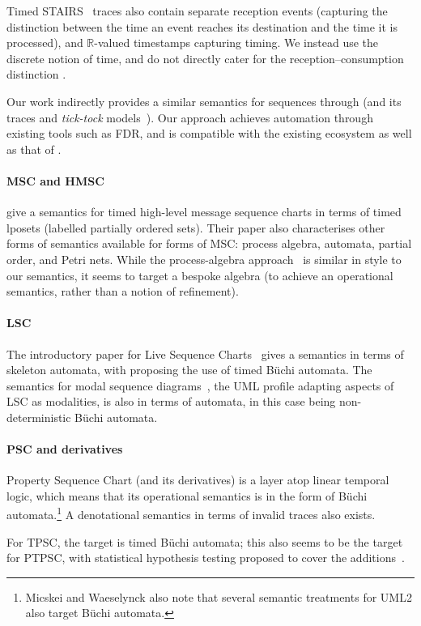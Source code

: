 Timed
STAIRS~\cite{Haugen05-TimedSTAIRS} traces also contain separate reception
events (capturing the distinction between the time an event reaches
its destination and the time it is processed), and \(\mathbb R\)-valued
timestamps capturing timing.  We instead use the discrete \tockcsp{} notion
of time, and do not directly cater for the reception--consumption distinction
.

Our work indirectly provides a similar semantics for \langname{}
sequences through \tockcsp{} (and its traces and \emph{tick-tock} models~\cite{Baxter21-TickTock}).
Our approach achieves automation through existing tools such as FDR,
and is compatible with the existing \robostar{} ecosystem as well as that of
\tockcsp.

\paragraph{MSC and HMSC}

\textcite{Kim06-THMSC} give a semantics for timed high-level message
sequence charts in terms of timed lposets (labelled partially ordered
sets).  Their paper also characterises other forms of semantics
available for forms of MSC: process algebra, automata, partial order,
and Petri nets.  While the process-algebra approach~\cite{Mauw99-MSCOpSem} is similar in
style to our \tockcsp{} semantics, it seems to target a bespoke
algebra (to achieve an operational semantics, rather than a notion of
refinement).

\paragraph{LSC}

The introductory paper for Live Sequence Charts~\cite{lsc} gives a
semantics in terms of skeleton automata, with \textcite{Brill04-LSCintro}
proposing the use of timed B\"uchi automata.
The semantics for modal sequence diagrams~\cite{Harel08-ModalSD}, the
UML profile adapting aspects of LSC as modalities, is also in terms of
automata, in this case being
non-deterministic B\"uchi automata.

\paragraph{PSC and derivatives}

Property Sequence Chart (and its derivatives) is a layer atop linear
temporal logic, which means that its operational semantics is in the
form of B\"uchi automata.\footnote{ Micskei and Waeselynck also note
  that several semantic treatments for UML2 also target B\"uchi
  automata.}  
A denotational semantics in terms of invalid traces also exists.

For TPSC, the target is timed B\"uchi automata; this also
seems to be the target for PTPSC, with statistical hypothesis testing
proposed to cover the additions~\cite{ptpsc}.

